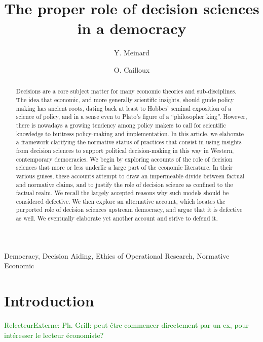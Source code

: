 \documentclass[preprint,11pt]{elsarticle}
\newcommand{\commentE}[1]{\textcolor{green}{RelecteurExterne: #1}}
\begin{document}
\title{The proper role of decision sciences in a democracy}
\author[ld]{Y. Meinard}
\author[ld]{O. Cailloux}
\address[ld]{Universit\'e Paris-Dauphine, PSL Research University, CNRS, UMR [7243], LAMSADE, 75016 PARIS, FRANCE}



\begin{abstract}
Decisions are a core subject matter for many economic theories and sub-disciplines. The idea that economic, and more generally scientific insights, should guide policy making has ancient roots, dating back at least to Hobbes’ seminal exposition of a science of policy, and in a sense even to Plato's figure of a ``philosopher king''. However, there is nowadays a growing tendency among policy makers to call for scientific knowledge to buttress policy-making and implementation. In this article, we elaborate a framework clarifying the normative status of practices that consist in using insights from decision sciences to support political decision-making in this way in Western, contemporary democracies. We begin by exploring accounts of the role of decision sciences that more or less underlie a large part of the economic literature. In their various guises, these accounts attempt to draw an impermeable divide between factual and normative claims, and to justify the role of decision science as confined to the factual realm. We recall the largely accepted reasons why such models should be considered defective. We then explore an alternative account, which locates the purported role of decision sciences upstream democracy, and argue that it is defective as well. We eventually elaborate yet another account and strive to defend it.

\end{abstract}

\begin{keyword}
Democracy, Decision Aiding, Ethics of Operational Research, Normative Economic
\end{keyword}

\maketitle

\section{Introduction}

\commentE{Ph. Grill: peut-être commencer directement par un ex, pour intéresser le lecteur économiste?}
\end{document}
